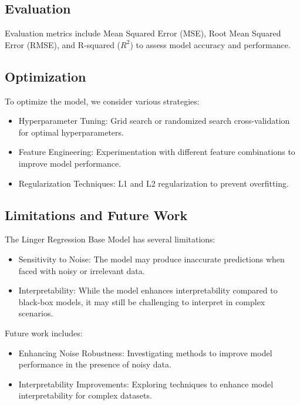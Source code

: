 \documentclass[a4paper, 12pt]{report}
\begin{document}
\subsection{Evaluation}
Evaluation metrics include Mean Squared Error (MSE), Root Mean Squared Error (RMSE), and R-squared ($R^2$) to assess model accuracy and performance.

\subsection{Optimization}
To optimize the model, we consider various strategies:
\begin{itemize}
    \item Hyperparameter Tuning: Grid search or randomized search cross-validation for optimal hyperparameters.
    \item Feature Engineering: Experimentation with different feature combinations to improve model performance.
    \item Regularization Techniques: L1 and L2 regularization to prevent overfitting.
\end{itemize}

\subsection{Limitations and Future Work}
The Linger Regression Base Model has several limitations:
\begin{itemize}
    \item Sensitivity to Noise: The model may produce inaccurate predictions when faced with noisy or irrelevant data.
    \item Interpretability: While the model enhances interpretability compared to black-box models, it may still be challenging to interpret in complex scenarios.
\end{itemize}
Future work includes:
\begin{itemize}
    \item Enhancing Noise Robustness: Investigating methods to improve model performance in the presence of noisy data.
    \item Interpretability Improvements: Exploring techniques to enhance model interpretability for complex datasets.
\end{itemize}
\end{document}
